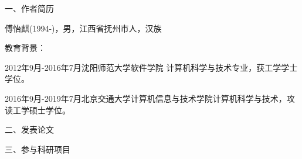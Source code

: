 \begin{results}
	一、作者简历
	
	\quad 傅怡麒(1994-)，男，江西省抚州市人，汉族
	
	\quad 教育背景：
	
	\quad 2012年9月-2016年7月\quad 沈阳师范大学软件学院 \quad 计算机科学与技术专业，获工学学士学位。
	
	\quad 2016年9月-2019年7月\quad 北京交通大学计算机信息与技术学院\quad 计算机科学与技术，攻读工学硕士学位。
	
	二、发表论文
	
	三、参与科研项目
\end{results}